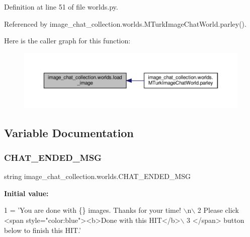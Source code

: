 Definition at line 51 of file worlds.\+py.



Referenced by image\+\_\+chat\+\_\+collection.\+worlds.\+M\+Turk\+Image\+Chat\+World.\+parley().

Here is the caller graph for this function\+:
\nopagebreak
\begin{figure}[H]
\begin{center}
\leavevmode
\includegraphics[width=350pt]{namespaceimage__chat__collection_1_1worlds_aa028ae9a4f66d727036827410f5483ec_icgraph}
\end{center}
\end{figure}


\subsection{Variable Documentation}
\mbox{\label{namespaceimage__chat__collection_1_1worlds_af62bcacd30f9acc5c9927f28fd1c0347}} 
\subsubsection{\texorpdfstring{C\+H\+A\+T\+\_\+\+E\+N\+D\+E\+D\+\_\+\+M\+SG}{CHAT\_ENDED\_MSG}}
{\footnotesize\ttfamily string image\+\_\+chat\+\_\+collection.\+worlds.\+C\+H\+A\+T\+\_\+\+E\+N\+D\+E\+D\+\_\+\+M\+SG}

{\bfseries Initial value\+:}
\begin{DoxyCode}
1 =  \textcolor{stringliteral}{'You are done with \{\} images. Thanks for your time! \(\backslash\)n\(\backslash\)}
2 \textcolor{stringliteral}{        Please click <span style="color:blue"><b>Done with this HIT</b>\(\backslash\)}
3 \textcolor{stringliteral}{        </span> button below to finish this HIT.'}
\end{DoxyCode}



